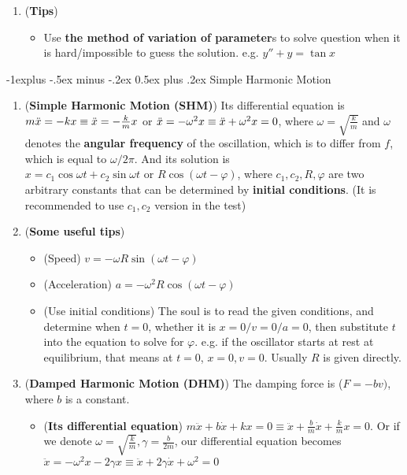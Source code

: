 \documentclass[10pt, landscape]{article}
\makeatletter
\renewcommand{\subsection}{\@startsection{subsection}{2}{0mm}%
                                {-1explus -.5ex minus -.2ex}%
                                {0.5ex plus .2ex}%
                                {\normalfont\normalsize\bfseries}}
\makeatother
\begin{document}
\begin{multicols}{4}
\begin{enumerate}
\begin{enumerate}
        \item (\textbf{Tips})
        \begin{itemize}
            \item Use \textbf{the method of variation of parameter}s to solve question when it is hard/impossible to guess the solution. e.g. $y''+y=\tan x$
        \end{itemize}
    \end{enumerate}
\end{enumerate}
\subsection{Simple Harmonic Motion}
\begin{enumerate}
    \item (\textbf{Simple Harmonic Motion (SHM)}) Its differential equation is $m\Ddot{x}=-kx \equiv \Ddot{x}=-\frac{k}{m}x$ or $\Ddot{x}=-\omega^2x \equiv \Ddot{x}+\omega^2x=0$, where $\omega=\sqrt{\frac{k}{m}}$ and $\omega$ denotes the \textbf{angular frequency} of the oscillation, which is to differ from $f$, which is equal to $\omega / 2\pi$. And its solution is $x=c_1\cos \omega t+c_2 \sin\omega t\text{ or }R\cos(\omega t-\varphi)$, where $c_1,c_2,R,\varphi$ are two arbitrary constants that can be determined by \textbf{initial conditions}. (It is recommended to use $c_1,c_2$ version in the test)
    \item (\textbf{Some useful tips}) 
    \begin{itemize}
        \item (Speed) $v=-\omega R\sin(\omega t-\varphi)$
        \item (Acceleration) $a=-\omega^2R\cos(\omega t-\varphi)$
        \item (Use initial conditions) The soul is to read the given conditions, and determine when $t=0$, whether it is $x=0/v=0/a=0$, then substitute $t$ into the equation to solve for $\varphi$. e.g. if the oscillator starts at rest at equilibrium, that means at $t=0$, $x=0,v=0$. Usually $R$ is given directly.
    \end{itemize}
    \item (\textbf{Damped Harmonic Motion (DHM)}) The damping force is ($F=-bv)$, where $b$ is a constant.
    \begin{itemize}
        \item (\textbf{Its differential equation}) $m\ddot{x}+b\dot{x}+kx=0 \equiv \ddot{x}+\frac{b}{m}\dot{x}+\frac{k}{m}x=0$. Or if we denote $\omega=\sqrt{\frac{k}{m}}, \gamma=\frac{b}{2m}$, our differential equation becomes $\ddot{x}=-\omega^2x-2\gamma x\equiv \ddot{x}+2\gamma \dot{x}+\omega^2=0$

\end{itemize}
\end{enumerate}
\end{multicols}
\end{document}
